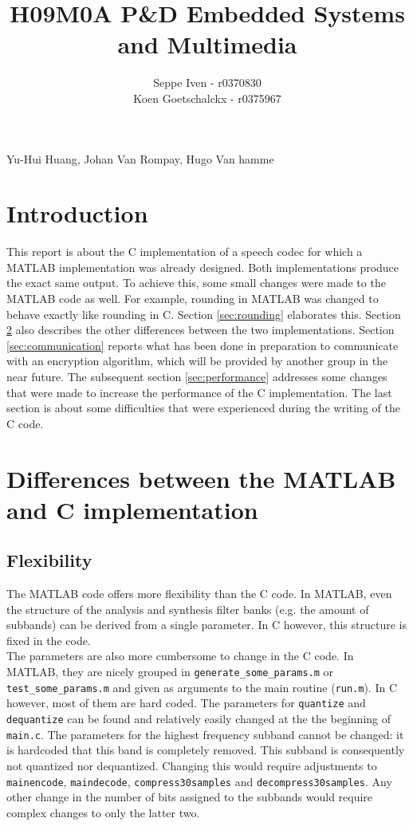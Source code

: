 \documentclass[a4paper]{article}
\title{H09M0A P\&D Embedded Systems and Multimedia}
\author{Seppe Iven - r0370830 \\ Koen Goetschalckx - r0375967}
\begin{document}
 
\maketitle
\begin{center} Yu-Hui Huang, Johan Van Rompay, Hugo Van hamme
\end{center}

\section{Introduction}
This report is about the C implementation of a speech codec for which a MATLAB implementation was already designed. Both implementations produce the exact same output. To achieve this, some small changes were made to the MATLAB code as well. For example, rounding in MATLAB was changed to behave exactly like rounding in C. Section \ref{sec:rounding} elaborates this. Section \ref{sec:differences} also describes the other differences between the two implementations. Section \ref{sec:communication} reports what has been done in preparation to communicate with an encryption algorithm, which will be provided by another group in the near future. The subsequent section \ref{sec:performance} addresses some changes that were made to increase the performance of the C implementation. The last section is about some difficulties that were experienced during the writing of the C code.

\section{Differences between the MATLAB and C implementation}\label{sec:differences}

\subsection{Flexibility}
The MATLAB code offers more flexibility than the C code. In MATLAB, even the structure of the analysis and synthesis filter banks (e.g. the amount of subbands) can be derived from a single parameter. In C however, this structure is fixed in the code.\\

The parameters are also more cumbersome to change in the C code. In MATLAB, they are nicely grouped in \texttt{generate\_some\_params.m} or \texttt{test\_some\_params.m} and given as arguments to the main routine (\texttt{run.m}). In C however, most of them are hard coded. The parameters for \texttt{quantize} and \texttt{dequantize} can be found and relatively easily changed at the the beginning of \texttt{main.c}. The parameters for the highest frequency subband cannot be changed: it is hardcoded that this band is completely removed. This subband is consequently not quantized nor dequantized. Changing this would require adjustments to \texttt{mainencode}, \texttt{maindecode}, \texttt{compress30samples} and \texttt{decompress30samples}. Any other change in the number of bits assigned to the subbands would require complex changes to only the latter two.\\
\end{document}
